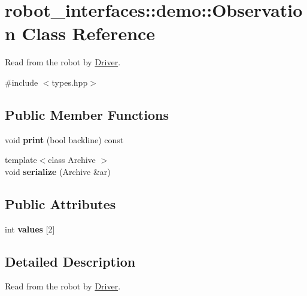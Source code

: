 \hypertarget{classrobot__interfaces_1_1demo_1_1Observation}{}\section{robot\+\_\+interfaces\+:\+:demo\+:\+:Observation Class Reference}
\label{classrobot__interfaces_1_1demo_1_1Observation}


Read from the robot by \hyperlink{classDriver}{Driver}.  




{\ttfamily \#include $<$types.\+hpp$>$}

\subsection*{Public Member Functions}
\begin{DoxyCompactItemize}
\item 
\mbox{\label{classrobot__interfaces_1_1demo_1_1Observation_a1bec6db0664543ac4d47c222b66b5af4}} 
void {\bfseries print} (bool backline) const
\item 
\mbox{\label{classrobot__interfaces_1_1demo_1_1Observation_adc50512a62b26a896da47f6f67dee44e}} 
{\footnotesize template$<$class Archive $>$ }\\void {\bfseries serialize} (Archive \&ar)
\end{DoxyCompactItemize}
\subsection*{Public Attributes}
\begin{DoxyCompactItemize}
\item 
\mbox{\label{classrobot__interfaces_1_1demo_1_1Observation_a930664896eceed4f3ee0de6f0e29bea4}} 
int {\bfseries values} \mbox{[}2\mbox{]}
\end{DoxyCompactItemize}


\subsection{Detailed Description}
Read from the robot by \hyperlink{classDriver}{Driver}. 

